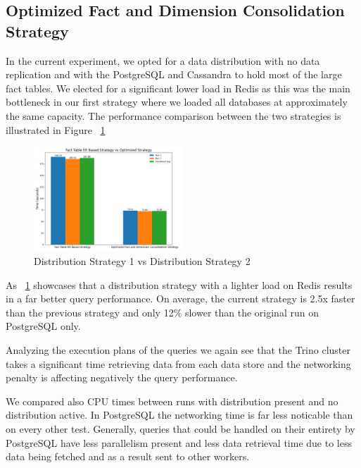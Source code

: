 \documentclass[conference]{IEEEtran}
\begin{document}
\subsection{Optimized Fact and Dimension Consolidation Strategy}
\label{sec:optimized-fact-dimension-consolidation-strategy}

In the current experiment, we opted for a data distribution with no data replication and with the PostgreSQL and Cassandra to hold most of the large fact tables. We elected for a significant lower load in Redis as this was the main bottleneck in our first strategy where we loaded all databases at approximately the same capacity. The performance comparison between the two strategies is illustrated in Figure ~\ref{fig:distro1-distro2}

\begin{figure}[h]
	\centering
	\includegraphics[width=0.5\textwidth]{images/dist1_vs_dist2/dist1_vs_dist2.png}
	\caption{Distribution Strategy 1 vs Distribution Strategy 2}
	\label{fig:distro1-distro2}
\end{figure}

As ~\ref{fig:distro1-distro2} showcases that a distribution strategy with a lighter load on Redis results in a far better query performance. On average, the current strategy is 2.5x faster than the previous strategy and only 12\% slower than the original run on PostgreSQL only.

Analyzing the execution plans of the queries we again see that the Trino cluster takes a significant time retrieving data from each data store and the networking penalty is affecting negatively the query performance.

We compared also CPU times between runs with distribution present and no distribution active. In PostgreSQL the networking time is far less noticable than on every other test. Generally, queries that could be handled on their entirety by PostgreSQL have less parallelism present and less data retrieval time due to less data being fetched and as a result sent to other workers.
\end{document}
